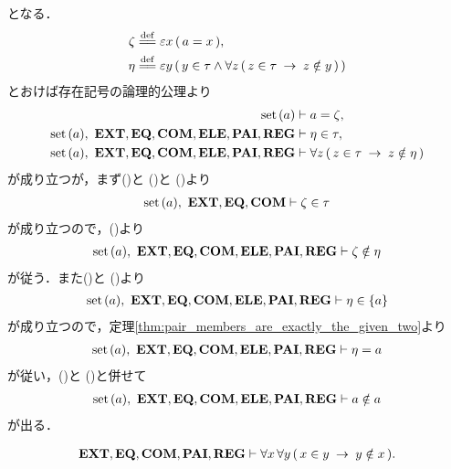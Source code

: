 \begin{sketch}
		となる．
		\begin{align}
			\zeta &\defeq \varepsilon x\, (\, a = x\, ), \\
			\eta &\defeq \varepsilon y\, (\, y \in \tau \wedge \forall z\, (\, 
			z \in \tau \rarrow z \notin y\, )\, )
		\end{align}
		とおけば存在記号の論理的公理より
		\begin{align}
			\operatorname*{set}\hspace{0.15em}(a) &\vdash a = \zeta, \label{fom:no_class_contains_itself_4} \\
			\operatorname*{set}\hspace{0.15em}(a),\ \mbox{{\bf EXT}},\mbox{{\bf EQ}},\mbox{\bf COM},\mbox{{\bf ELE}},\mbox{{\bf PAI}},\mbox{{\bf REG}} &\vdash 
			\eta \in \tau, \label{fom:no_class_contains_itself_5} \\
			\operatorname*{set}\hspace{0.15em}(a),\ \mbox{{\bf EXT}},\mbox{{\bf EQ}},\mbox{\bf COM},\mbox{{\bf ELE}},\mbox{{\bf PAI}},\mbox{{\bf REG}} &\vdash 
			\forall z\, (\, z \in \tau \hspace{0.25em}\rightarrow\hspace{0.25em} z \notin \eta\, )
			\label{fom:no_class_contains_itself_6}
		\end{align}
		が成り立つが，まず()と
		()と
		()より
		\begin{align}
			\operatorname*{set}\hspace{0.15em}(a),\ \mbox{{\bf EXT}},\mbox{{\bf EQ}},\mbox{\bf COM} \vdash \zeta \in \tau
		\end{align}
		が成り立つので，()より
		\begin{align}
			\operatorname*{set}\hspace{0.15em}(a),\ \mbox{{\bf EXT}},\mbox{{\bf EQ}},\mbox{\bf COM},\mbox{{\bf ELE}},\mbox{{\bf PAI}},\mbox{{\bf REG}} \vdash 
			\zeta \notin \eta
			\label{fom:no_class_contains_itself_7}
		\end{align}
		が従う．また()と
		()より
		\begin{align}
			\operatorname*{set}\hspace{0.15em}(a),\ \mbox{{\bf EXT}},\mbox{{\bf EQ}},\mbox{\bf COM},\mbox{{\bf ELE}},\mbox{{\bf PAI}},\mbox{{\bf REG}} \vdash \eta \in \{a\}
		\end{align}
		が成り立つので，定理\ref{thm:pair_members_are_exactly_the_given_two}より
		\begin{align}
			\operatorname*{set}\hspace{0.15em}(a),\ \mbox{{\bf EXT}},\mbox{{\bf EQ}},\mbox{\bf COM},\mbox{{\bf ELE}},\mbox{{\bf PAI}},\mbox{{\bf REG}} \vdash \eta = a
		\end{align}
		が従い，()と
		()と併せて
		\begin{align}
			\operatorname*{set}\hspace{0.15em}(a),\ \mbox{{\bf EXT}},\mbox{{\bf EQ}},\mbox{\bf COM},\mbox{{\bf ELE}},\mbox{{\bf PAI}},\mbox{{\bf REG}} \vdash a \notin a
		\end{align}
		が出る．
		\QED
	\end{sketch}
	
	\begin{screen}
		\begin{thm}[集合のどの二組も所属関係で堂々巡りしない]
		\label{thm:no_pair_of_sets_go_round}
			\begin{align}
				\mbox{{\bf EXT}},\mbox{{\bf EQ}},\mbox{\bf COM},\mbox{{\bf PAI}},\mbox{{\bf REG}} \vdash 
				\forall x\, \forall y\, (\, x \in y \hspace{0.25em}\rightarrow\hspace{0.25em} y \notin x\, ).
			\end{align}
		\end{thm}
	\end{screen}
	

